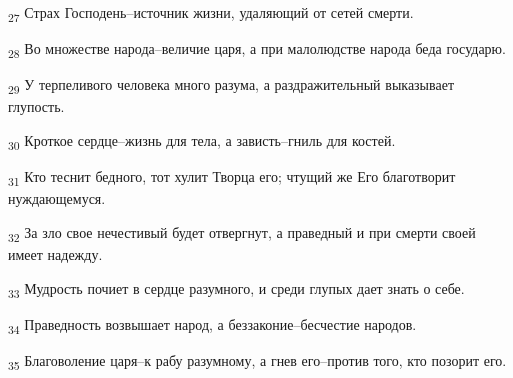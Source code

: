 \begin{tcolorbox}
\textsubscript{27} Страх Господень--источник жизни, удаляющий от сетей смерти.
\end{tcolorbox}
\begin{tcolorbox}
\textsubscript{28} Во множестве народа--величие царя, а при малолюдстве народа беда государю.
\end{tcolorbox}
\begin{tcolorbox}
\textsubscript{29} У терпеливого человека много разума, а раздражительный выказывает глупость.
\end{tcolorbox}
\begin{tcolorbox}
\textsubscript{30} Кроткое сердце--жизнь для тела, а зависть--гниль для костей.
\end{tcolorbox}
\begin{tcolorbox}
\textsubscript{31} Кто теснит бедного, тот хулит Творца его; чтущий же Его благотворит нуждающемуся.
\end{tcolorbox}
\begin{tcolorbox}
\textsubscript{32} За зло свое нечестивый будет отвергнут, а праведный и при смерти своей имеет надежду.
\end{tcolorbox}
\begin{tcolorbox}
\textsubscript{33} Мудрость почиет в сердце разумного, и среди глупых дает знать о себе.
\end{tcolorbox}
\begin{tcolorbox}
\textsubscript{34} Праведность возвышает народ, а беззаконие--бесчестие народов.
\end{tcolorbox}
\begin{tcolorbox}
\textsubscript{35} Благоволение царя--к рабу разумному, а гнев его--против того, кто позорит его.
\end{tcolorbox}
